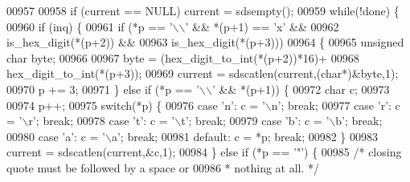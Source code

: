\begin{DoxyCode}
{{{{{{{{{{{{{{{{00957 
00958             \textcolor{keywordflow}{if} (current == NULL) current = sdsempty();
00959             \textcolor{keywordflow}{while}(!done) \{
00960                 \textcolor{keywordflow}{if} (inq) \{
00961                     \textcolor{keywordflow}{if} (*p == \textcolor{stringliteral}{'\(\backslash\)\(\backslash\)'} && *(p+1) == \textcolor{stringliteral}{'x'} &&
00962                                              is\_hex\_digit(*(p+2)) &&
00963                                              is\_hex\_digit(*(p+3)))
00964                     \{
00965                         \textcolor{keywordtype}{unsigned} \textcolor{keywordtype}{char} byte;
00966 
00967                         byte = (hex\_digit\_to\_int(*(p+2))*16)+
00968                                 hex\_digit\_to\_int(*(p+3));
00969                         current = sdscatlen(current,(\textcolor{keywordtype}{char}*)&byte,1);
00970                         p += 3;
00971                     \} \textcolor{keywordflow}{else} \textcolor{keywordflow}{if} (*p == \textcolor{stringliteral}{'\(\backslash\)\(\backslash\)'} && *(p+1)) \{
00972                         \textcolor{keywordtype}{char} c;
00973 
00974                         p++;
00975                         \textcolor{keywordflow}{switch}(*p) \{
00976                         \textcolor{keywordflow}{case} \textcolor{stringliteral}{'n'}: c = \textcolor{stringliteral}{'\(\backslash\)n'}; \textcolor{keywordflow}{break};
00977                         \textcolor{keywordflow}{case} \textcolor{stringliteral}{'r'}: c = \textcolor{stringliteral}{'\(\backslash\)r'}; \textcolor{keywordflow}{break};
00978                         \textcolor{keywordflow}{case} \textcolor{stringliteral}{'t'}: c = \textcolor{stringliteral}{'\(\backslash\)t'}; \textcolor{keywordflow}{break};
00979                         \textcolor{keywordflow}{case} \textcolor{stringliteral}{'b'}: c = \textcolor{stringliteral}{'\(\backslash\)b'}; \textcolor{keywordflow}{break};
00980                         \textcolor{keywordflow}{case} \textcolor{stringliteral}{'a'}: c = \textcolor{stringliteral}{'\(\backslash\)a'}; \textcolor{keywordflow}{break};
00981                         \textcolor{keywordflow}{default}: c = *p; \textcolor{keywordflow}{break};
00982                         \}
00983                         current = sdscatlen(current,&c,1);
00984                     \} \textcolor{keywordflow}{else} \textcolor{keywordflow}{if} (*p == \textcolor{stringliteral}{'"'}) \{
00985                         \textcolor{comment}{/* closing quote must be followed by a space or}
00986 \textcolor{comment}{                         * nothing at all. */}
}}}}}}}}}}}}}}}}
\end{DoxyCode}
